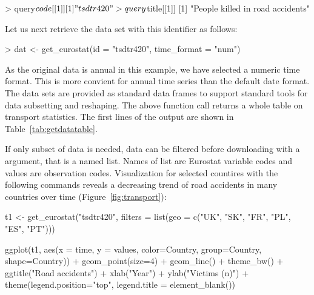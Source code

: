 \begin{example}
> query$code[[1]]
[1] "tsdtr420"

> query$title[[1]]
[1] "People killed in road accidents"
\end{example}


Let us next retrieve the data set with this identifier as follows:

\begin{example}
> dat <- get_eurostat(id = "tsdtr420", time_format = "num")
\end{example}

As the original data is annual in this example, we have selected a
numeric time format. This is more convient for annual time series than
the default date format. The data sets are provided as standard data
frames to support standard tools for data subsetting and
reshaping. The above function call returns a whole table on transport
statistics.  The first lines of the output are shown in
Table~\ref{tab:getdatatable}. 

If only subset of data is needed, data can be filtered before downloading with
a  argument, that is a named list. Names of list are 
Eurostat variable codes and values are observation codes. Visualization for
selected countires with the following commands
reveals a decreasing trend of road accidents in many countries over
time (Figure~\ref{fig:transport}):


\begin{example}
t1 <- get_eurostat("tsdtr420", 
  filters = list(geo = c("UK", "SK", "FR", "PL", "ES", "PT"))) 

ggplot(t1, aes(x = time, y = values, color=Country, group=Country, shape=Country)) +
  geom_point(size=4) + 
  geom_line() + theme_bw() + ggtitle("Road accidents") +
  xlab("Year") + ylab("Victims (n)") + 
  theme(legend.position="top", legend.title = element_blank())   
\end{example}

